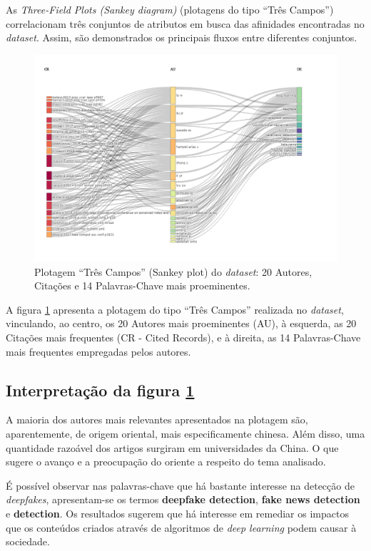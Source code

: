 As \textit{Three-Field Plots (Sankey diagram)} (plotagens do tipo ``Três Campos'') correlacionam três conjuntos de atributos em busca das afinidades encontradas no \textit{dataset}. Assim, são demonstrados os principais fluxos entre diferentes conjuntos.

\begin{figure}
    \centering
    \includegraphics[width=1\textwidth]{experiments/titofrota/PesquisaBibliometrica/Deepfakes/ThreeFieldPlot.png}
    \caption{Plotagem ``Três Campos'' (Sankey plot) do \textit{dataset}: 20 Autores, Citações e 14 Palavras-Chave mais proeminentes.}
    \label{fig:DEEPFAKES@titofrota:ThreeFieldPlot}
\end{figure}

A figura \ref{fig:DEEPFAKES@titofrota:ThreeFieldPlot} apresenta a plotagem do tipo ``Três Campos'' realizada no \textit{dataset}, vinculando, ao centro, os 20 Autores mais proeminentes (AU), à esquerda, as 20 Citações mais frequentes (CR - Cited Records), e à direita, as 14 Palavras-Chave mais frequentes empregadas pelos autores.

\subsection{Interpretação da figura \ref{fig:DEEPFAKES@titofrota:ThreeFieldPlot}}
A maioria dos autores mais relevantes apresentados na plotagem são, aparentemente, de origem oriental, mais especificamente chinesa. Além disso, uma quantidade razoável dos artigos surgiram em universidades da China. O que sugere o avanço e a preocupação do oriente a respeito do tema analisado.

É possível observar nas palavras-chave que há bastante interesse na detecção de \textit{deepfakes}, apresentam-se os termos \textbf{deepfake detection}, \textbf{fake news detection} e \textbf{detection}. Os resultados sugerem que há interesse em remediar os impactos que os conteúdos criados através de algoritmos de \textit{deep learning} podem causar à sociedade.

